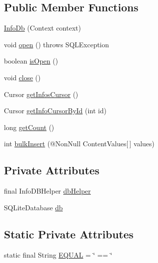 \subsection*{Public Member Functions}
\begin{DoxyCompactItemize}
\item 
\hyperlink{classorg_1_1buildmlearn_1_1infotemplate_1_1data_1_1InfoDb_ab079b6a8a63e0d7c66fe0cd92e53914b}{Info\+Db} (Context context)
\item 
void \hyperlink{classorg_1_1buildmlearn_1_1infotemplate_1_1data_1_1InfoDb_a02fdd90b41b979672b0f970c769f091a}{open} ()  throws S\+Q\+L\+Exception 
\item 
boolean \hyperlink{classorg_1_1buildmlearn_1_1infotemplate_1_1data_1_1InfoDb_a610f028f98cf106a40c79b28a8c11737}{is\+Open} ()
\item 
void \hyperlink{classorg_1_1buildmlearn_1_1infotemplate_1_1data_1_1InfoDb_afaee8571a4f792ac73c2054e67b42d33}{close} ()
\item 
Cursor \hyperlink{classorg_1_1buildmlearn_1_1infotemplate_1_1data_1_1InfoDb_af5dfbdd6cdf248f42bb335ce12ebc307}{get\+Infos\+Cursor} ()
\item 
Cursor \hyperlink{classorg_1_1buildmlearn_1_1infotemplate_1_1data_1_1InfoDb_a9e14ec17e91f6d2a622abc06d1002262}{get\+Info\+Cursor\+By\+Id} (int id)
\item 
long \hyperlink{classorg_1_1buildmlearn_1_1infotemplate_1_1data_1_1InfoDb_aa7ef8a94b3c1e5bdea3f2312d17f4485}{get\+Count} ()
\item 
int \hyperlink{classorg_1_1buildmlearn_1_1infotemplate_1_1data_1_1InfoDb_a525d8f1b862745c73e92dadd8494220f}{bulk\+Insert} (@Non\+Null Content\+Values\mbox{[}$\,$\mbox{]} values)
\end{DoxyCompactItemize}
\subsection*{Private Attributes}
\begin{DoxyCompactItemize}
\item 
final Info\+D\+B\+Helper \hyperlink{classorg_1_1buildmlearn_1_1infotemplate_1_1data_1_1InfoDb_a648e48d236e5f45787f49d4757f8bab4}{db\+Helper}
\item 
S\+Q\+Lite\+Database \hyperlink{classorg_1_1buildmlearn_1_1infotemplate_1_1data_1_1InfoDb_a04c6cacb2825eccf5af6d4144c722b04}{db}
\end{DoxyCompactItemize}
\subsection*{Static Private Attributes}
\begin{DoxyCompactItemize}
\item 
static final String \hyperlink{classorg_1_1buildmlearn_1_1infotemplate_1_1data_1_1InfoDb_a1c646d2a231625792c3c91af4221731c}{E\+Q\+U\+AL} = \char`\"{} == \char`\"{}
\end{DoxyCompactItemize}


